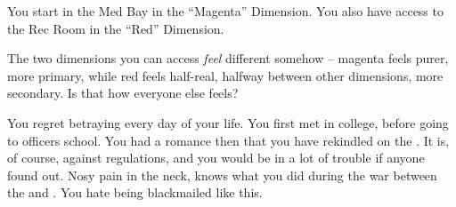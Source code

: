 \documentclass[char]{TMFHope}
\begin{document}
\begin{itemz}[Notes]
	\item You start in the Med Bay in the ``Magenta'' Dimension. You also have access to the Rec Room in the ``Red'' Dimension. 
	\item The two dimensions you can access {\em feel} different somehow -- magenta feels purer, more primary, while red feels half-real, halfway between other dimensions, more secondary.  Is that how everyone else feels?
\end{itemz}

\begin{contacts}
	\contact{\cCap{}} You regret betraying \cCap{} every day of your life.
	\contact{\cSci{}} You first met \cSci{} in college, before going to officers school. You had a romance then that you have rekindled on the \pNew{}. It is, of course, against regulations, and you would be in a lot of trouble if anyone found out.
	\contact{\cDip{}} Nosy pain in the neck, \cDip{} knows what you did during the war between the \pPlan{} and \pEdge{}. You hate being blackmailed like this.
\end{contacts}
\end{document}
